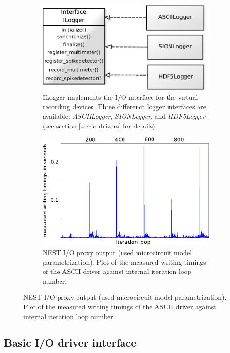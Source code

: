 \documentclass[]{YIC2015}
\begin{document}
\begin{figure}[tb]
\centering %
\begin{subfigure}[b]{0.49\textwidth}
                \includegraphics[width=.85\linewidth]{loggerinterface.eps}
                \caption{ILogger implements the I/O interface for the virtual
			recording devices.  Three differenct logger interfaces are
			available: \emph{ASCIILogger}, \emph{SIONLogger}, and
			\emph{HDF5Logger} (see section \ref{sec:io-drivers} for details). \cite{yuml}}
                \label{fig:loggerinterface}
        \end{subfigure}%
        \hspace{0.009\textwidth}
        \begin{subfigure}[b]{0.49\textwidth}
	      \includegraphics[width=.85\linewidth]{ascii_plot_10_8.eps}
	      \caption{NEST I/O proxy output (used microcircuit model parametrization).
	      Plot of the measured writing timings of the ASCII driver against internal iteration loop number.}
	      \label{fig:asciiplot}
        \end{subfigure}%


\end{figure}

\subsection{Basic I/O driver interface}
\end{document}
